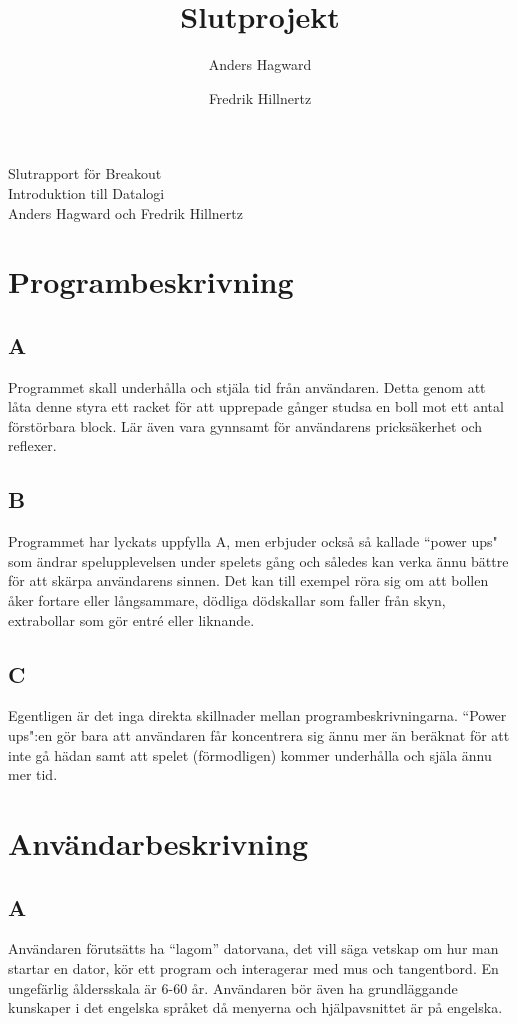 \documentclass[11pt,a4paper]{article}
\author{Anders Hagward \and Fredrik Hillnertz}
\title{Slutprojekt}
\begin{document}
\thispagestyle{empty}
\begin{center}
\Huge Slutrapport för Breakout \\
\Large Introduktion till Datalogi \\
\normalsize Anders Hagward och Fredrik Hillnertz
\end{center}
\newpage

\tableofcontents
\newpage

\section{Programbeskrivning}

\subsection{A}
Programmet skall underhålla och stjäla tid från användaren. Detta genom att låta denne styra ett racket för att upprepade gånger studsa en boll mot ett antal förstörbara block. Lär även vara gynnsamt för användarens pricksäkerhet och reflexer.

\subsection{B}
Programmet har lyckats uppfylla A, men erbjuder också så kallade ``power ups" som ändrar spelupplevelsen under spelets gång och således kan verka ännu bättre för att skärpa användarens sinnen. Det kan till exempel röra sig om att bollen åker fortare eller långsammare, dödliga dödskallar som faller från skyn, extrabollar som gör entré eller liknande.

\subsection{C}
Egentligen är det inga direkta skillnader mellan programbeskrivningarna. ``Power ups":en gör bara att användaren får koncentrera sig ännu mer än beräknat för att inte gå hädan samt att spelet (förmodligen) kommer underhålla och själa ännu mer tid.

\section{Användarbeskrivning}

\subsection{A}
Användaren förutsätts ha ``lagom'' datorvana, det vill säga vetskap om hur man startar en dator, kör ett program och interagerar med mus och tangentbord. En ungefärlig åldersskala är 6-60 år. Användaren bör även ha grundläggande kunskaper i det engelska språket då menyerna och hjälpavsnittet är på engelska.
\end{document}
